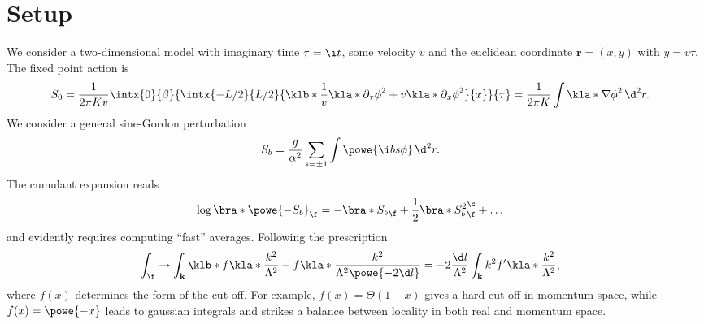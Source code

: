 \documentclass[english, parskip=full]{scrartcl}
\title{\titel}
\author{\autor}
\date{\today}
\begin{document}
\maketitle  %

\section{Setup}
We consider a two-dimensional model with imaginary time $\tau=\i t$, some velocity $v$ and the euclidean coordinate $\textbf{r}=(x,y)$ with $y=v\tau$.
The fixed point action is
\begin{align}
S_0 &= \frac{1}{2\pi Kv}\intx{0}{\beta}{ \intx{-L/2}{L/2}{\klb*{\frac{1}{v}\kla*{\partial_\tau\phi}^2 + v\kla*{\partial_x\phi}^2}}{x} }{\tau} = \frac{1}{2\pi K} \int \kla*{\nabla\phi}^2 \,\d^2r.
\end{align}
We consider a general sine-Gordon perturbation
\begin{align}
S_b &= \frac{g}{\alpha^2} \sum_{s=\pm 1} \int \powe{\i bs\phi}\,\d^2r.
\end{align}
The cumulant expansion reads
\begin{align}
\log\bra*{\powe{-S_b}}_\f &= -\bra*{S_b}_\f + \frac{1}{2} \bra*{S_b^2}_\f^\c + \dots
\end{align}
and evidently requires computing ``fast'' averages.
Following the prescription
\begin{align}
\int_\f &\rightarrow \int_\textbf{k} \klb*{f\kla*{\frac{k^2}{\Lambda^2}} - f\kla*{\frac{k^2}{\Lambda^2 \powe{-2\d l}}}} = -2\frac{\d l}{\Lambda^2} \int_\textbf{k} k^2 f'\kla*{\frac{k^2}{\Lambda^2}},
\end{align}
where $f(x)$ determines the form of the cut-off.
For example, $f(x)=\Theta(1-x)$ gives a hard cut-off in momentum space, while $f(x)=\powe{-x}$ leads to gaussian integrals and strikes a balance between locality in both real and momentum space.
\end{document}
